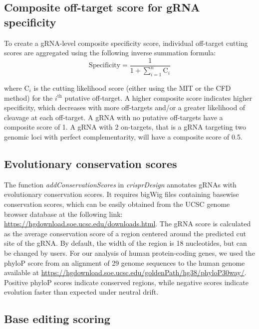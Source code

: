 \documentclass[pdftex,english,10pt]{article}
\begin{document}
{%
\subsection*{Composite off-target score for gRNA specificity}

To create a gRNA-level composite specificity score, individual off-target cutting scores are aggregated using the following inverse summation formula:
\begin{equation}
\text{Specificity} = \frac{1}{1+\sum_{i=1}^n\text{C}_i}
\end{equation}

where $\text{C}_i$ is the cutting likelihood score (either using the MIT or the CFD method) for the $i^{\text{th}}$ putative off-target. A higher composite score indicates higher specificity, which decreases with more off-targets and/or a greater likelihood of cleavage at each off-target. A gRNA with no putative off-targets have a composite score of 1. A gRNA with 2 on-targets, that is a gRNA targeting two genomic loci with perfect complementarity, will have a composite score of 0.5. 




\subsection*{Evolutionary conservation scores}

The function \textit{addConservationScores} in \textit{crisprDesign} annotates gRNAs with evolutionary conservation scores. It requires bigWig files containing basewise conservation scores, which can be easily obtained from the UCSC genome browser database \citep{ucsc} at the following link: \url{https://hgdownload.soe.ucsc.edu/downloads.html}. The gRNA score is calculated as the average conservation score of a region centered around the predicted cut site of the gRNA. By default, the width of the region is 18 nucleotides, but can be changed by users. For our analysis of human protein-coding genes, we used the phyloP score from an alignment of 29 genome sequences to the human genome available at \url{https://hgdownload.soe.ucsc.edu/goldenPath/hg38/phyloP30way/}. Positive phyloP scores indicate conserved regions, while negative scores indicate evolution faster than expected under neutral drift. 



\subsection*{Base editing scoring}


}
\end{document}
